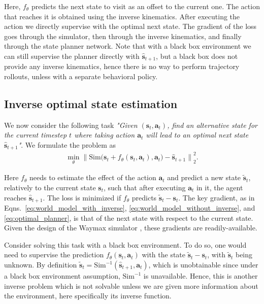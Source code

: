 Here, $f_\theta$ predicts the next state to visit as an offset to the current one. The action that reaches it is obtained using the inverse kinematics. After executing the action we directly supervise with the optimal next state. The gradient of the loss goes through the simulator, then through the inverse kinematics, and finally through the state planner network. Note that with a black box environment we can still supervise the planner directly with $\hat{\mathbf{s}}_{t+1}$, but a black box does not provide any inverse kinematics, hence there is no way to perform trajectory rollouts, unless with a separate behavioral policy.

\subsection{Inverse optimal state estimation}
\label{subsection: inverse_state_estimation}

We now consider the following task \emph{"Given $(\mathbf{s}_t, \mathbf{a}_t)$, find an alternative state for the current timestep $t$ where taking action $\mathbf{a}_t$ will lead to an optimal next state $\hat{\mathbf{s}}_{t+1}$"}. We formulate the problem as
\begin{equation} \label{eq:inverse_state_estimation}
\begin{aligned}
\min_\theta {\Big\lVert \text{Sim} \big(\mathbf{s}_t + f_\theta(\mathbf{s}_t, \mathbf{a}_t), \mathbf{a}_t \big) - \hat{\mathbf{s}}_{t + 1} \Big\rVert}_2^2.
\end{aligned}
\end{equation}

Here $f_\theta$ needs to estimate the effect of the action $\mathbf{a}_t$ and predict a new state $\tilde{\mathbf{s}}_t$, relatively to the current state $\mathbf{s}_t$, such that after executing $\mathbf{a}_t$ in it, the agent reaches $\hat{\mathbf{s}}_{t + 1}$. The loss is minimized if $f_\theta$ predicts $\tilde{\mathbf{s}}_t - \mathbf{s}_t$. The key gradient, as in Eqns.~\ref{eq:world_model_with_inverse}, \ref{eq:world_model_without_inverse}, and \ref{eq:optimal_planner}, is that of the next state with respect to the current state. Given the design of the Waymax simulator \cite{gulino2024waymax}, these gradients are readily-available.

Consider solving this task with a black box environment. To do so, one would need to supervise the prediction  $f_\theta(\mathbf{s}_t, \mathbf{a}_t)$ with the state $\tilde{\mathbf{s}}_t - \mathbf{s}_t$, with $\tilde{\mathbf{s}}_t$ being unknown. By definition $\tilde{\mathbf{s}}_t = \text{Sim}^{-1}(\hat{\mathbf{s}}_{t+1}, \mathbf{a}_t)$, which is unobtainable since under a black box environment assumption, $\text{Sim}^{-1}$ is unavailable. Hence, this is another inverse problem which is not solvable unless we are given more information about the environment, here specifically its inverse function.

